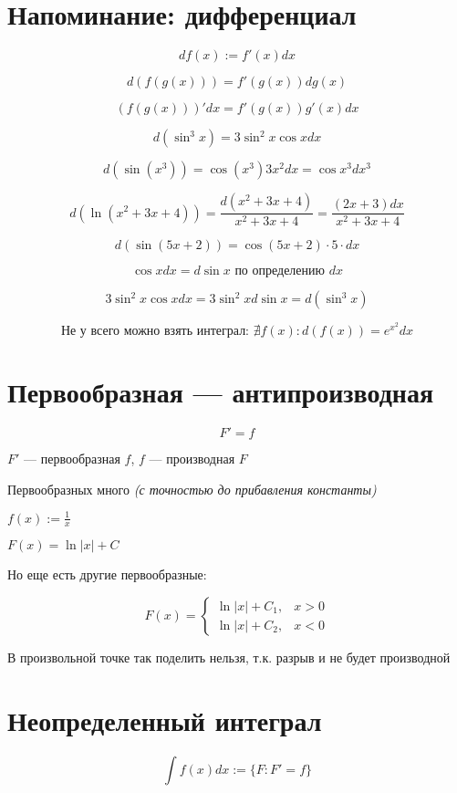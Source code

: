



\section{Напоминание: дифференциал}

$$df(x):=f'(x)dx$$

$$d(f(g(x)))=f'(g(x))dg(x)$$

$$(f(g(x)))'dx=f'(g(x))g'(x)dx$$

$$d(\sin^3 x) = 3 \sin ^2 x \cos x dx$$

$$d(\sin (x^3))=\cos (x^3) 3x^2 dx = \cos x^3 dx^3$$

$$d(\ln(x^2+3x+4))=\frac{d(x^2+3x+4)}{x^2+3x+4}=\frac{(2x+3)dx}{x^2+3x+4}$$

$$d(\sin(5x+2))=\cos(5x+2)\cdot 5\cdot dx$$

$$\cos x dx = d\sin x \text{ по определению } dx$$

$$3\sin^2x\cos x dx=3\sin^2x d\sin x=d(\sin^3 x)$$

$$\text{Не у всего можно взять интеграл: }\nexists f(x) : d(f(x))=e^{x^2}dx$$

\section{Первообразная --- антипроизводная}

$$F'=f$$

$F'$ --- первообразная $f$, $f$ --- производная $F$

Первообразных много \textit{(с точностью до прибавления константы)}

$f(x):=\frac{1}{x}$

$F(x)=\ln|x| + C$

Но еще есть другие первообразные:

$$F(x)=\begin{cases}
        \ln|x| + C_1, & x > 0 \\
        \ln|x| + C_2, & x < 0
    \end{cases}$$

В произвольной точке так поделить нельзя, т.к. разрыв и не будет производной

\section{Неопределенный интеграл}

$$\int\! f(x)dx:=\{F: F' = f\}$$

